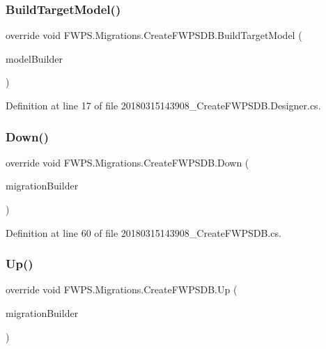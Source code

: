 \subsubsection{\texorpdfstring{Build\+Target\+Model()}{BuildTargetModel()}}
{\footnotesize\ttfamily override void F\+W\+P\+S.\+Migrations.\+Create\+F\+W\+P\+S\+D\+B.\+Build\+Target\+Model (\begin{DoxyParamCaption}\item[{Model\+Builder}]{model\+Builder }\end{DoxyParamCaption})\hspace{0.3cm}{\ttfamily [protected]}}



Definition at line 17 of file 20180315143908\+\_\+\+Create\+F\+W\+P\+S\+D\+B.\+Designer.\+cs.

\mbox{\label{class_f_w_p_s_1_1_migrations_1_1_create_f_w_p_s_d_b_a9bdde297a0c7ec1c835146549a3d8eed}} 
\subsubsection{\texorpdfstring{Down()}{Down()}}
{\footnotesize\ttfamily override void F\+W\+P\+S.\+Migrations.\+Create\+F\+W\+P\+S\+D\+B.\+Down (\begin{DoxyParamCaption}\item[{Migration\+Builder}]{migration\+Builder }\end{DoxyParamCaption})\hspace{0.3cm}{\ttfamily [protected]}}



Definition at line 60 of file 20180315143908\+\_\+\+Create\+F\+W\+P\+S\+D\+B.\+cs.

\mbox{\label{class_f_w_p_s_1_1_migrations_1_1_create_f_w_p_s_d_b_ab1f5efdd20dfb530ad4b6095bff64560}} 
\subsubsection{\texorpdfstring{Up()}{Up()}}
{\footnotesize\ttfamily override void F\+W\+P\+S.\+Migrations.\+Create\+F\+W\+P\+S\+D\+B.\+Up (\begin{DoxyParamCaption}\item[{Migration\+Builder}]{migration\+Builder }\end{DoxyParamCaption})\hspace{0.3cm}{\ttfamily [protected]}}




